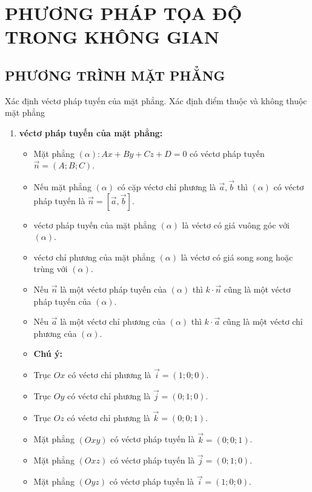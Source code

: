 \chapter{PHƯƠNG PHÁP TỌA ĐỘ TRONG KHÔNG GIAN}
\section{PHƯƠNG TRÌNH MẶT PHẲNG}
\begin{dang}{Xác định véctơ pháp tuyến của mặt phẳng. Xác định điểm thuộc và không thuộc mặt phẳng}
	\begin{enumerate}[label=\bf\arabic*.]
		\item \textbf{véctơ pháp tuyến của mặt phẳng:}
		\begin{itemize}
			\item Mặt phẳng $(\alpha)\colon A x+B y+C z+D=0$ có véctơ pháp tuyến $\overrightarrow{n}=(A; B; C)$.
			\item Nếu mặt phẳng $(\alpha)$ có cặp véctơ chỉ phương là $\overrightarrow{a}, \overrightarrow{b}$ thì $(\alpha)$ có véctơ pháp tuyến là $\overrightarrow{n}=\left[\overrightarrow{a}, \overrightarrow{b}\right]$.
			\item véctơ pháp tuyến của mặt phẳng $(\alpha)$ là véctơ có giá vuông góc với $(\alpha)$.
			\item véctơ chỉ phương của mặt phẳng $(\alpha)$ là véctơ có giá song song hoặc trùng với $(\alpha)$.
			\item Nếu $\overrightarrow{n}$ là một véctơ pháp tuyến của $(\alpha)$ thì $k \cdot \overrightarrow{n}$ cũng là một véctơ pháp tuyến của $(\alpha)$.
			\item Nếu $\overrightarrow{a}$ là một véctơ chỉ phương của $(\alpha)$ thì $k \cdot \overrightarrow{a}$ cũng là một véctơ chỉ phương của $(\alpha)$.
			\item[] \textbf{Chú ý:}
			\item Trục $O x$ có véctơ chỉ phương là $\overrightarrow{i}=(1; 0; 0)$.
			\item Trục $O y$ có véctơ chỉ phương là $\overrightarrow{j}=(0; 1; 0)$.
			\item Trục $O z$ có véctơ chỉ phương là $\overrightarrow{k}=(0; 0; 1)$.
			\item Mặt phẳng $(O x y)$ có véctơ pháp tuyến là $\overrightarrow{k}=(0; 0; 1)$.
			\item Mặt phẳng $(O x z)$ có véctơ pháp tuyến là $\overrightarrow{j}=(0; 1; 0)$.
			\item Mặt phẳng $(O y z)$ có véctơ pháp tuyến là $\overrightarrow{i}=(1; 0; 0)$.

\end{itemize}
\end{enumerate}
\end{dang}
